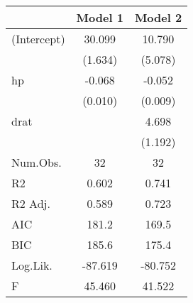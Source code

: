 \begin{table}
\centering
\begin{tabular}[t]{lcc}
\toprule
  & Model 1 & Model 2\\
\midrule
(Intercept) & 30.099 & 10.790\\
 & (1.634) & (5.078)\\
hp & -0.068 & -0.052\\
 & (0.010) & (0.009)\\
drat &  & 4.698\\
 &  & (1.192)\\
\midrule
Num.Obs. & 32 & 32\\
R2 & 0.602 & 0.741\\
R2 Adj. & 0.589 & 0.723\\
AIC & 181.2 & 169.5\\
BIC & 185.6 & 175.4\\
Log.Lik. & -87.619 & -80.752\\
F & 45.460 & 41.522\\
\bottomrule
\end{tabular}
\end{table}
